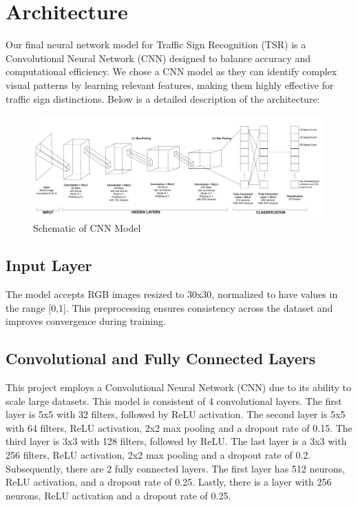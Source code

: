 \documentclass{article} %
\begin{document}
\label{headings}

\section{Architecture}
Our final neural network model for Traffic Sign Recognition (TSR) is a Convolutional Neural Network (CNN) designed to balance accuracy and computational efficiency. We chose a CNN model as they can identify complex visual patterns by learning relevant features, making them highly effective for traffic sign distinctions. Below is a detailed description of the architecture:
 
\begin{figure}[h]
    \centering
    \includegraphics[width=0.5\linewidth]{CNN Schematic.png}
    \caption{Schematic of CNN Model}
    \label{fig:enter-label}
\end{figure}
\label{others}
\subsection{Input Layer} 
The model accepts RGB images resized to 30x30, normalized to have values in the range [0,1]. This preprocessing ensures consistency across the dataset and improves convergence during training.

\subsection{Convolutional and Fully Connected Layers}
This project employs a Convolutional Neural Network (CNN) due to its ability to scale large datasets. This model is consistent of 4 convolutional layers. The first layer is 5x5 with 32 filters, followed by ReLU activation. The second layer is 5x5 with 64 filters, ReLU activation, 2x2 max pooling and a dropout rate of 0.15. The third layer is 3x3 with 128 filters, followed by ReLU. The last layer is a 3x3 with 256 filters, ReLU activation, 2x2 max pooling and a dropout rate of 0.2. Subsequently, there are 2 fully connected layers. The first layer has 512 neurons, ReLU activation, and a dropout rate of 0.25. Lastly, there is a layer with 256 neurons, ReLU activation and a dropout rate of 0.25. 
\end{document}
